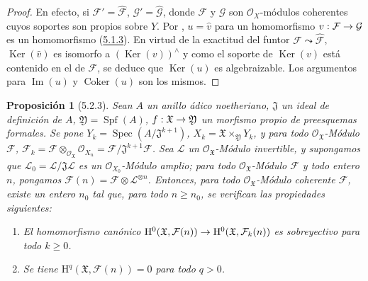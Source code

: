 \documentclass[10pt,oneside,openany]{book}
\theoremstyle{egaenv}\newtheorem*{env}{---}
\theoremstyle{egastatement}
\newtheorem*{proposition}{Proposición}
\theoremstyle{egadescription}
\renewcommand{\geq}{\geqslant}
\renewcommand{\to}{\mathchoice{\longrightarrow}{\rightarrow}{\rightarrow}{\rightarrow}}
\begin{document}
\begin{proof}
En efecto, si $\mathcal F'=\widehat{\mathcal F}$,
$\mathcal G'=\widehat{\mathcal G}$, donde $\mathcal F$ y $\mathcal G$ son $\mathcal O_X$-módulos coherentes cuyos
soportes son propios sobre $Y$. Por ,
$u=\widehat v$ para un homomorfismo
$v:\mathcal F\to\mathcal G$ es un homomorfismo
(\hyperref[III.5.1.3-fr]{5.1.3}). En virtud de la exactitud del funtor
$\mathcal F\leadsto\widehat{\mathcal F}$,
$\operatorname{Ker}(\widehat v)$ es isomorfo a
$(\operatorname{Ker}(v))^{\wedge}$ y como el soporte de
$\operatorname{Ker}(v)$ está contenido en el de $\mathcal F$, se deduce que
$\operatorname{Ker}(u)$ es algebraizable. Los argumentos para $\operatorname{Im}(u)$ y
$\operatorname{Coker}(u)$ son los mismos.
\end{proof}

\begin{proposition}[5.2.3]
\label{III.5.2.3-fr}
Sean $A$ un anillo ádico noetheriano, $\mathfrak J$ un ideal de definición de
$A$, $\mathfrak Y=\operatorname{Spf}(A)$,
$f:\mathfrak X\to\mathfrak Y$ un morfismo propio de preesquemas formales. Se pone
$Y_k=\operatorname{Spec}(A/\mathfrak J^{k+1})$,
$X_k=\mathfrak X\times_{\mathfrak Y}Y_k$, y para todo
$\mathcal O_{\mathfrak X}$-Módulo $\mathcal F$,
$\mathcal F_k=\mathcal F\otimes_{\mathcal O_{\mathfrak X}}\mathcal O_{X_n}
=\mathcal F/\mathfrak J^{k+1}\mathcal F$.
Sea $\mathcal L$ un $\mathcal O_{\mathfrak X}$-Módulo invertible, y supongamos que
$\mathcal L_0=\mathcal L/\mathfrak J\mathcal L$ es un
$\mathcal O_{X_0}$-Módulo amplio; para todo $\mathcal O_{\mathfrak X}$-Módulo
$\mathcal F$ y todo entero $n$, pongamos
$\mathcal F(n)=\mathcal F\otimes\mathcal L^{\otimes n}$. Entonces, para todo
$\mathcal O_{\mathfrak X}$-Módulo coherente $\mathcal F$, existe un entero $n_0$
tal que, para todo $n\geq n_0$, se verifican las propiedades siguientes:
\begin{enumerate}
\item[\textup{(i)}] El homomorfismo canónico
$\mathrm H^0(\mathfrak X,\mathcal F(n))\to
\mathrm H^0(\mathfrak X,\mathcal F_k(n))$ es sobreyectivo para todo $k\geq0$.
\item[\textup{(ii)}] Se tiene $\mathrm H^q(\mathfrak X,\mathcal F(n))=0$ para todo $q>0$.
\end{enumerate}
\end{proposition}
\end{document}
